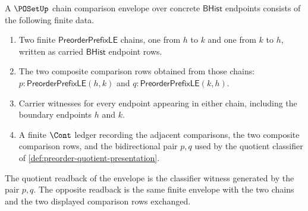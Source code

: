 \begin{definition}
\label{def:poset-chain-comparison-envelope}
A $\POSetUp$ chain comparison envelope over concrete $\mathsf{BHist}$
endpoints consists of the following finite data.
\begin{enumerate}
  \item Two finite $\mathsf{PreorderPrefixLE}$ chains, one from $h$ to $k$ and
  one from $k$ to $h$, written as carried $\mathsf{BHist}$ endpoint rows.
  \item The two composite comparison rows obtained from those chains:
  $p:\mathsf{PreorderPrefixLE}(h,k)$ and
  $q:\mathsf{PreorderPrefixLE}(k,h)$.
  \item Carrier witnesses for every endpoint appearing in either chain,
  including the boundary endpoints $h$ and $k$.
  \item A finite $\Cont$ ledger recording the adjacent comparisons, the two
  composite comparison rows, and the bidirectional pair $p,q$ used by the
  quotient classifier of \autoref{def:preorder-quotient-presentation}.
\end{enumerate}
The quotient readback of the envelope is the classifier witness generated by
the pair $p,q$. The opposite readback is the same finite envelope with the two
chains and the two displayed comparison rows exchanged.
\end{definition}

